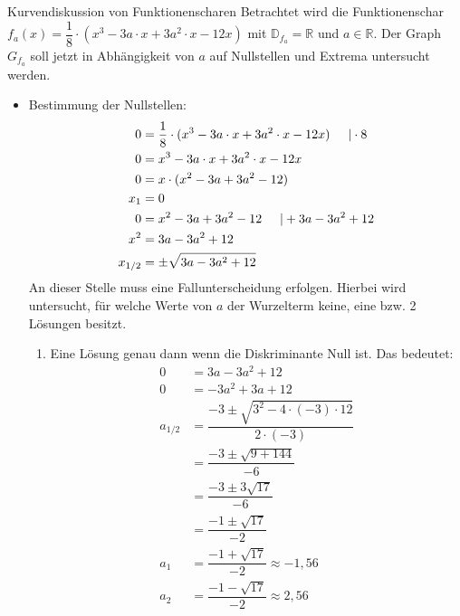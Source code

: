 \begin{bsp}{Kurvendiskussion von Funktionenscharen}{}
Betrachtet wird die Funktionenschar $f_a(x) = \dfrac{1}{8} \cdot (x^3 - 3a\cdot x +3a^2 \cdot x -12x)$ mit $\mathds{D}_{f_a} = \mathds{R}$ und $a \in \mathds{R}$. Der Graph $G_{f_a}$ soll jetzt in Abhängigkeit von $a$ auf Nullstellen und Extrema untersucht werden.
\begin{itemize}
    \item Bestimmung der Nullstellen:
\begin{equation*}
    \begin{split}
         0 &= \dfrac{1}{8} \cdot (x^3 - 3a\cdot x +3a^2 \cdot x -12x) \hspace{0.5cm} | \cdot 8\\
         0 &= x^3 - 3a\cdot x +3a^2 \cdot x -12x\\
         0 &= x\cdot(x^2 -3a + 3a^2 -12)\\
         x_1&= 0\\
         0 &= x^2 -3a+3a^2 -12\hspace{0.5cm} | +3a-3a^2+12\\
         x^2 &= 3a-3a^2+12\\
         x_{1/2} &= \pm \sqrt{3a-3a^2+12}
        \end{split}
\end{equation*}
An dieser Stelle muss eine Fallunterscheidung erfolgen. Hierbei wird untersucht, für welche Werte von $a$ der Wurzelterm keine, eine bzw. 2 Lösungen besitzt.
\begin{enumerate}
    \item Eine Lösung genau dann wenn die Diskriminante  Null ist. Das bedeutet:
    \begin{equation*}
    \begin{split}
         0 &= 3a-3a^2+12\\
       0 &= -3a^2 +3a +12 \\
       a_{1/2} &= \dfrac{-3 \pm \sqrt{3^2 -4\cdot (-3)\cdot 12}}{2\cdot (-3)}\\
       &= \dfrac{-3\pm \sqrt{9+144}}{-6}\\
       &= \dfrac{-3\pm 3\sqrt{17}}{-6}\\
       &= \dfrac{-1\pm \sqrt{17}}{-2}\\
       a_1&= \dfrac{-1 +\sqrt{17}}{-2}\approx -1,56\\
       a_2&= \dfrac{-1 -\sqrt{17}}{-2} \approx 2,56
        \end{split}
\end{equation*}

\end{enumerate}
\end{itemize}
\end{bsp}
